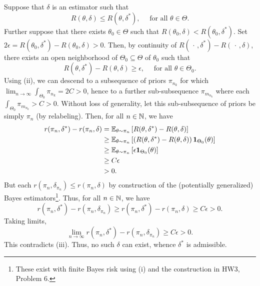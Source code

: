 \documentclass[11pt]{article}
\begin{document}
\begin{enumerate}
        Suppose that $\delta$ is an estimator such that \[
            R(\theta, \delta) \leq R(\theta, \delta^*), \quad \text{ for all } \theta \in \Theta.
        \] Further suppose that there exists $\theta_0 \in \Theta$ such that
        $R(\theta_0, \delta) < R(\theta_0, \delta^*)$.
        Set $2\epsilon = R(\theta_0, \delta^*) - R(\theta_0, \delta) > 0$.
        Then, by continuity of $R(\,\cdot\,, \delta^*) - R(\,\cdot\,, \delta)$,
        there exists an open neighborhood of $\Theta_0 \subseteq \Theta$ of
        $\theta_0$ such that \[
            R(\theta, \delta^*) - R(\theta, \delta) \geq \epsilon, \quad \text{ for all } \theta \in \Theta_0.
        \] Using (ii), we can descend to a subsequence of priors $\pi_{n_k}$ for
        which $\lim_{n \to \infty} \int_{\Theta_0} \pi_{n_k} = 2C > 0$, hence to a
        further sub-subsequence $\pi_{m_{n_k}}$ where each $\int_{\Theta_0}
        \pi_{m_{n_k}} > C > 0$.
        Without loss of generality, let this sub-subsequence of priors be
        simply $\pi_n$ (by relabeling).
        Then, for all $n \in \mathbb{N}$, we have \begin{align*}
            r(\pi_n, \delta^*) - r(\pi_n, \delta)
                &= \mathbb{E}_{\theta \sim \pi_n}\left[R(\theta, \delta^*) - R(\theta, \delta)\right] \\
                &\geq \mathbb{E}_{\theta \sim \pi_n}\left[\left(R(\theta, \delta^*) - R(\theta, \delta)\right) \bm{1}_{\Theta_0}(\theta)\right] \\
                &\geq \mathbb{E}_{\theta \sim \pi_n}\left[\epsilon \bm{1}_{\Theta_0}(\theta)\right] \\
                &\geq C\epsilon \\
                &> 0.
        \end{align*}
        But each $r(\pi_n, \delta_{\pi_n}) \leq r(\pi_n, \delta)$ by
        construction of the (potentially generalized) Bayes
        estimators\footnote{These exist with finite Bayes risk using (i) and
        the construction in HW3, Problem 6.}.
        Thus, for all $n \in \mathbb{N}$, we have \[
            r(\pi_n, \delta^*) - r(\pi_n, \delta_{\pi_n})
                \geq r(\pi_n, \delta^*) - r(\pi_n, \delta)
                \geq C\epsilon
                > 0.
        \] Taking limits, \[
            \lim_{n \to \infty} r(\pi_n, \delta^*) - r(\pi_n, \delta_{\pi_n})
                \geq C\epsilon > 0.
        \] This contradicts (iii).
        Thus, no such $\delta$ can exist, whence $\delta^*$ is admissible.


    \end{enumerate}
\end{document}
